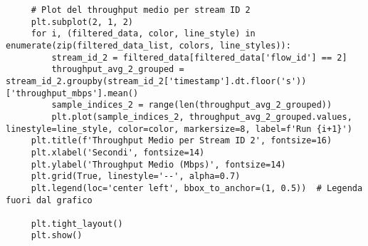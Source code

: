 \begin{lstlisting}
     # Plot del throughput medio per stream ID 2
     plt.subplot(2, 1, 2)
     for i, (filtered_data, color, line_style) in enumerate(zip(filtered_data_list, colors, line_styles)):
         stream_id_2 = filtered_data[filtered_data['flow_id'] == 2]
         throughput_avg_2_grouped = stream_id_2.groupby(stream_id_2['timestamp'].dt.floor('s'))['throughput_mbps'].mean()
         sample_indices_2 = range(len(throughput_avg_2_grouped))
         plt.plot(sample_indices_2, throughput_avg_2_grouped.values, linestyle=line_style, color=color, markersize=8, label=f'Run {i+1}')
     plt.title(f'Throughput Medio per Stream ID 2', fontsize=16)
     plt.xlabel('Secondi', fontsize=14)
     plt.ylabel('Throughput Medio (Mbps)', fontsize=14)
     plt.grid(True, linestyle='--', alpha=0.7)
     plt.legend(loc='center left', bbox_to_anchor=(1, 0.5))  # Legenda fuori dal grafico
     
     plt.tight_layout()
     plt.show()     
\end{lstlisting}